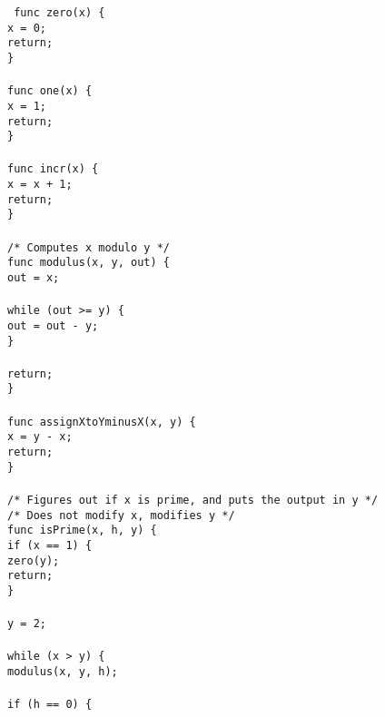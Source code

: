 {\tiny \tt \noindent \onehalfspacing \parskip 0pt
func zero(x) \{ \\
\hspace{5mm} x = 0; \\
    return; \\
\} \\
\\
func one(x) \{ \\
    x = 1; \\
    return; \\
\} \\
\\
func incr(x) \{ \\
    x = x + 1; \\
    return; \\
\} \\
\\
/* Computes x modulo y */ \\
func modulus(x, y, out) \{ \\
    out = x; \\
\\    
    while (out >= y) \{ \\
        out = out - y; \\
    \} \\
\\     
    return; \\
\} \\
\\
func assignXtoYminusX(x, y) \{ \\
    x = y - x; \\
    return; \\
\} \\
\\
/* Figures out if x is prime, and puts the output in y */ \\
/* Does not modify x, modifies y */ \\
func isPrime(x, h, y) \{ \\
    if (x == 1) \{ \\ 
        zero(y); \\
        return; \\
    \} \\
\\    
    y = 2; \\
\\    
    while (x > y) \{ \\
        modulus(x, y, h); \\
\\    
        if (h == 0) \{ \\
}
